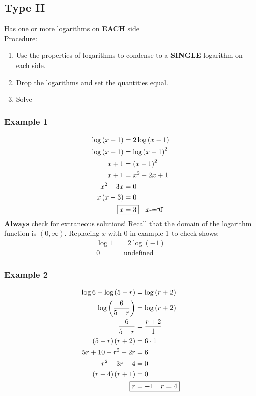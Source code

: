 \documentclass{amsart}
\begin{document}
\begin{footnotesize}
\begin{multicols}{4}
\columnbreak
\subsection*{Type II}
Has one or more logarithms on \textbf{EACH} side\\
Procedure:
\begin{enumerate}
\item Use the properties of logarithms to condense to a \textbf{SINGLE} logarithm on each side.
\item Drop the logarithms and set the quantities equal. 
\item Solve
\end{enumerate}
\subsubsection*{Example 1}
\begin{align*}
\log\left(x+1\right)&=2\log\left(x-1\right)\\
\log\left(x+1\right)&=\log\left(x-1\right)^2\\
x+1&=\left(x-1\right)^2\\
x+1&=x^2-2x+1\\
x^2-3x&=0\\
x\left(x-3\right)&=0\\
\Aboxed{x&=3}\quad \cancel{x=0}
\end{align*}
\textbf{Always} check for extraneous solutions!
Recall that the domain of the logarithm function is $\left(0,\infty\right)$. 
Replacing $x$ with $0$ in example 1 to check shows:\\
\begin{align*}
\log1 &= 2\log\left(-1\right)\\
0&=\text{undefined}
\end{align*}
\subsubsection*{Example 2}
\begin{align*}
\log 6-\log\left(5-r\right)&=\log\left(r+2\right)\\
\log\left(\frac{6}{5-r}\right)&=\log\left(r+2\right)\\
\frac{6}{5-r}&=\frac{r+2}{1}\\
\left(5-r\right)\left(r+2\right)&=6\cdot 1\\
5r+10-r^2-2r&=6\\
r^2-3r-4&=0\\
\left(r-4\right)\left(r+1\right)&=0\\
\Aboxed{r&=-1\quad r=4}
\end{align*}
\end{multicols}
\end{footnotesize}
\end{document}
